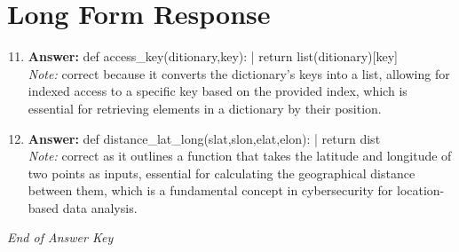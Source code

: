 \documentclass[12pt]{article}
\begin{document}
\section*{Long Form Response}
\begin{enumerate}[label=\arabic*.]
\setcounter{enumi}{10}
\item \textbf{Answer:} def access\_key(ditionary,key): | return list(ditionary)[key]
\\ \textit{Note:} correct because it converts the dictionary's keys into a list, allowing for indexed access to a specific key based on the provided index, which is essential for retrieving elements in a dictionary by their position.
\item \textbf{Answer:} def distance\_lat\_long(slat,slon,elat,elon): | return dist
\\ \textit{Note:} correct as it outlines a function that takes the latitude and longitude of two points as inputs, essential for calculating the geographical distance between them, which is a fundamental concept in cybersecurity for location-based data analysis.
\end{enumerate}

\vfill
\noindent\textit{End of Answer Key}
\end{document}
